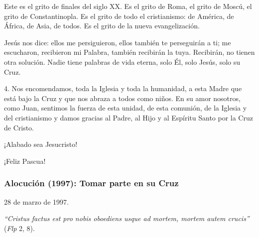 			\begin{body}Este es el grito de finales del siglo XX. Es el grito de Roma, el grito de Moscú, el grito de Constantinopla. Es el grito de todo el cristianismo: de América, de África, de Asia, de todos. Es el grito de la nueva evangelización. \end{body}
			
			\begin{body}Jesús nos dice: ellos me persiguieron, ellos también te perseguirán a ti; me escucharon, recibieron mi Palabra, también recibirán la tuya. Recibirán, no tienen otra solución. Nadie tiene palabras de vida eterna, solo Él, solo Jesús, solo su Cruz. \end{body}
			
			\begin{body}\begin{bodysmall}\end{bodysmall}\end{body}
			
			\begin{body}4. Nos encomendamos, toda la Iglesia y toda la humanidad, a esta Madre que está bajo la Cruz y que nos abraza a todos como niños. En su amor nosotros, como Juan, sentimos la fuerza de esta unidad, de esta comunión, de la Iglesia y del cristianismo y damos gracias al Padre, al Hijo y al Espíritu Santo por la Cruz de Cristo. \end{body}
			
			\begin{body}¡Alabado sea Jesucristo! \end{body}
			
			\begin{body}¡Feliz Pascua!\end{body}
			
			\subsubsection{Alocución (1997): Tomar parte en su Cruz}
			
			\begin{referencia}28 de marzo de 1997.\end{referencia}
			
			\begin{body} \textit{“Cristus factus est pro nobis oboediens usque ad mortem, mortem autem crucis”} (\textit{Flp} 2, 8).\end{body}
			
